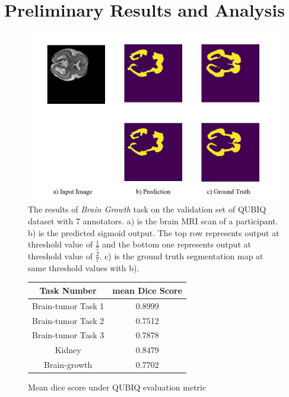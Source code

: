 \documentclass[12pt]{extarticle}
\begin{document}
\section{Preliminary Results and Analysis}
\begin{figure}[hb!]
\centering
\includegraphics[scale=0.28]{fig1.jpg}
\caption{The results of \textit{Brain Growth} task on the validation set of 
QUBIQ dataset with 7 annotators. a) is the brain 
MRI scan of a participant. b) is the predicted sigmoid output. The top row represents output at threshold  
value of $\frac{1}{7}$ and the bottom one represents output at threshold value of $\frac{2}{7}$. c) is the 
ground truth segmentation map at same threshold values with b).}
\label{U-Net}
\end{figure}
\begin{figure}[hb!]
\begin{center}
    \begin{tabular}{|| c c ||}
       \hline
       Task Number & mean Dice Score \\
       \hline \hline
        Brain-tumor Task 1 & 0.8999 \\
        Brain-tumor Task 2 & 0.7512 \\
        Brain-tumor Task 3 & 0.7878 \\
        Kidney & 0.8479 \\
        Brain-growth & 0.7702  \\
        \hline \hline
    \end{tabular}
\end{center}
\caption{Mean dice score under QUBIQ evaluation metric}
\end{figure}
\end{document}
